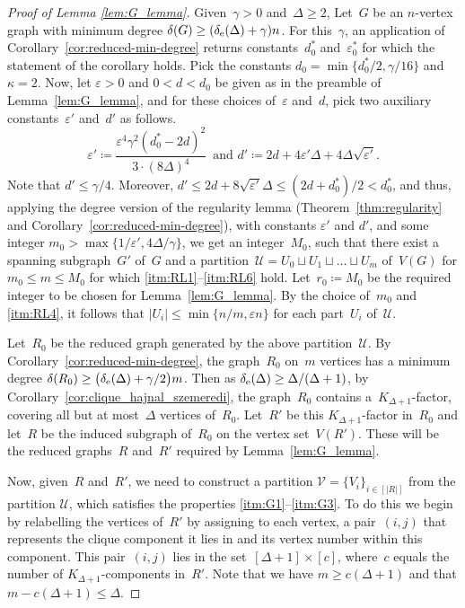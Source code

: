 \documentclass[final]{article}
\theoremstyle{definition}
\newcommand{\eps}{\varepsilon}
\newcommand{\exth}{\delta_{\rm e}(\Delta)}
\begin{document}
\begin{proof}[Proof of Lemma \ref{lem:G_lemma}]
 Given~$\gamma > 0$ and~$\Delta \geq 2$, Let~$G$ be an $n$-vertex graph with minimum degree $\delta(G) \geq (\exth + \gamma)n$. For this~$\gamma$, an application of Corollary~\ref{cor:reduced-min-degree} returns constants~$d^*_0$ and~$\eps^*_0$ for which the statement of the corollary holds. Pick the constants $d_0 = \min \bigl\{ d_0^*/2 , \gamma/16 \bigr\}$ and~$\kappa = 2$. Now, let $\eps > 0$ and $0 < d < d_0$ be given as in the preamble of Lemma~\ref{lem:G_lemma}, and for these choices of~$\eps$ and~$d$, pick two auxiliary constants~$\eps'$ and~$d'$ as follows.  
 $$\eps'  \coloneqq   \frac{\eps^4\gamma^2 (d_0^* - 2d)^2}{3 \cdot (8\Delta)^4}\, \text{ and }
   d' \coloneqq 2d + 4\eps' \Delta + 4\Delta\sqrt{\eps'}.$$
\indent Note that $d' \leq \gamma /4$. Moreover, $d' \leq 2d + 8 \sqrt{\eps'}\Delta \leq (2d + d_0^*)/2 < d_0^*$, and thus, applying the degree version of the regularity lemma (Theorem~\ref{thm:regularity} and Corollary~\ref{cor:reduced-min-degree}), with constants $\eps'$ and $d'$, and some integer $m_0 > \max\{1/\eps', 4\Delta/\gamma\}$, we get an integer~$M_0$, such that there exist a spanning subgraph~$G'$ of~$G$ and a partition~$\mathcal{U} = U_0 \sqcup U_1 \sqcup \dots \sqcup U_m$ of~$V(G)$ for $m_0 \leq m \leq M_0$ for which \ref{itm:RL1}--\ref{itm:RL6} hold. Let~$r_0 \coloneqq  M_0$ be the required integer to be chosen for Lemma~\ref{lem:G_lemma}. By the choice of~$m_0$ and \ref{itm:RL4}, it follows that $|U_i| \leq \min\{n/m, \eps n\}$ for each part~$U_i$ of~$\mathcal{U}$.  

 Let~$R_0$ be the reduced graph generated by the above partition~$\mathcal{U}$. By Corollary~\ref{cor:reduced-min-degree}, the graph~$R_0$ on~$m$ vertices has a minimum degree $\delta(R_0) \geq \big(\exth + \gamma/2\big)m$. Then as $\exth\ge \Delta/(\Delta+1)$, by Corollary~\ref{cor:clique_hajnal_szemeredi}, the graph~$R_0$ contains a~$K_{\Delta+1}$-factor, covering all but at most~$\Delta$ vertices of~$R_0$. Let~$R'$ be this $K_{\Delta+1}$-factor in~$R_0$ and let~$R$ be the induced subgraph of~$R_0$ on the vertex set~$V(R')$. These will be the reduced graphs~$R$ and~$R'$ required by Lemma~\ref{lem:G_lemma}. 
 
 Now, given~$R$ and~$R'$, we need to construct a partition $\mathcal{V} = \{V_i\}_{i\in [|R|]}$ from the partition $\mathcal{U}$, which satisfies the properties \ref{itm:G1}--\ref{itm:G3}. To do this we begin by relabelling the vertices of~$R'$ by assigning to each vertex, a pair~$(i,j)$ that represents the clique component it lies in and its vertex number within this component. This pair~$(i,j)$ lies in the set~$[\Delta +1]\times[c]$, where~$c$ equals the number of $K_{\Delta+1}$-components in~$R'$. Note that we have $m \geq c(\Delta +1)$ and that $m - c(\Delta +1) \leq \Delta$. 
 

\end{proof}
\end{document}
